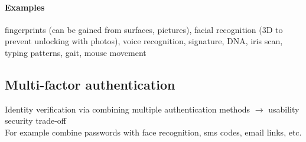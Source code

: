 \documentclass[12pt]{article}
\begin{document}
	\paragraph{Examples} fingerprints (can be gained from surfaces, pictures), facial recognition (3D to prevent unlocking with photos), voice recognition, signature, DNA, iris scan, typing patterns, gait, mouse movement
	
	\subsection{Multi-factor authentication}
	Identity verification via combining multiple authentication methods $\rightarrow$ usability security trade-off\\
	For example combine passwords with face recognition, sms codes, email links, etc.
	
\end{document}
